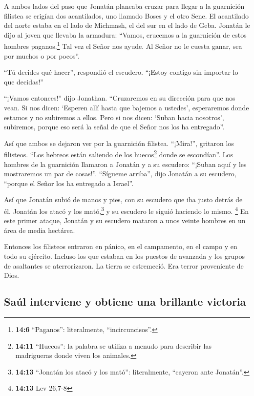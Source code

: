 A ambos lados del paso que Jonatán planeaba cruzar para
llegar a la guarnición filistea se erigían dos acantilados, uno llamado
Boses y el otro Sene.  El acantilado del norte estaba en
el lado de Michmash, el del sur en el lado de Geba. 
Jonatán le dijo al joven que llevaba la armadura: ``Vamos, crucemos a la
guarnición de estos hombres paganos.\footnote{\textbf{14:6} ``Paganos'':
  literalmente, ``incircuncisos''.} Tal vez el Señor nos ayude. Al Señor
no le cuesta ganar, sea por muchos o por pocos''.

 ``Tú decides qué hacer'', respondió el escudero. ``¡Estoy
contigo sin importar lo que decidas!''

 ``¡Vamos entonces!'' dijo Jonathan. ``Cruzaremos en su
dirección para que nos vean.  Si nos dicen: `Esperen allí
hasta que bajemos a ustedes', esperaremos donde estamos y no subiremos a
ellos.  Pero si nos dicen: `Suban hacia nosotros',
subiremos, porque eso será la señal de que el Señor nos los ha
entregado''.

 Así que ambos se dejaron ver por la guarnición filistea.
``¡Mira!'', gritaron los filisteos. ``Los hebreos están saliendo de los
huecos\footnote{\textbf{14:11} ``Huecos'': la palabra se utiliza a
  menudo para describir las madrigueras donde viven los animales.} donde
se escondían''.  Los hombres de la guarnición llamaron a
Jonatán y a su escudero: ``¡Suban aquí y les mostraremos un par de
cosas!''. ``Sígueme arriba'', dijo Jonatán a su escudero, ``porque el
Señor los ha entregado a Israel''.

 Así que Jonatán subió de manos y pies, con su escudero
que iba justo detrás de él. Jonatán los atacó y los mató,\footnote{\textbf{14:13}
  ``Jonatán los atacó y los mató'': literalmente, ``cayeron ante
  Jonatán''.} y su escudero le siguió haciendo lo mismo. \footnote{\textbf{14:13}
  Lev 26,7-8}  En este primer ataque, Jonatán y su
escudero mataron a unos veinte hombres en un área de media hectárea.

 Entonces los filisteos entraron en pánico, en el
campamento, en el campo y en todo su ejército. Incluso los que estaban
en los puestos de avanzada y los grupos de asaltantes se aterrorizaron.
La tierra se estremeció. Era terror proveniente de Dios.

\hypertarget{sauxfal-interviene-y-obtiene-una-brillante-victoria}{%
\subsection{Saúl interviene y obtiene una brillante
victoria}\label{sauxfal-interviene-y-obtiene-una-brillante-victoria}}


